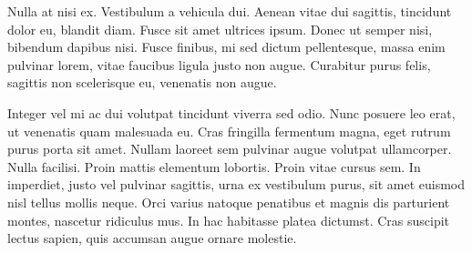 Nulla at nisi ex. Vestibulum a vehicula dui. Aenean vitae dui sagittis, tincidunt dolor eu, blandit diam. Fusce sit amet ultrices ipsum. Donec ut semper nisi, bibendum dapibus nisi. Fusce finibus, mi sed dictum pellentesque, massa enim pulvinar lorem, vitae faucibus ligula justo non augue. Curabitur purus felis, sagittis non scelerisque eu, venenatis non augue.

Integer vel mi ac dui volutpat tincidunt viverra sed odio. Nunc posuere leo erat, ut venenatis quam malesuada eu. Cras fringilla fermentum magna, eget rutrum purus porta sit amet. Nullam laoreet sem pulvinar augue volutpat ullamcorper. Nulla facilisi. Proin mattis elementum lobortis. Proin vitae cursus sem. In imperdiet, justo vel pulvinar sagittis, urna ex vestibulum purus, sit amet euismod nisl tellus mollis neque. Orci varius natoque penatibus et magnis dis parturient montes, nascetur ridiculus mus. In hac habitasse platea dictumst. Cras suscipit lectus sapien, quis accumsan augue ornare molestie.